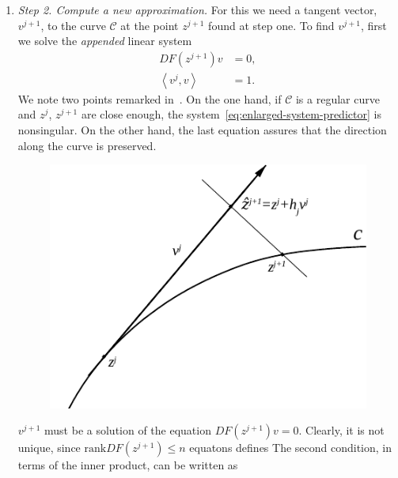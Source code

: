 \documentclass[11pt,reqno,twoside]{article}
\theoremstyle{remark}
\begin{document}
\begin{enumerate}[label = \emph{\arabic*.}]
\begin{displaymath}
\begin{split}
        z^{j}\right\rangle - h_{j}
        \end{split}
    \end{displaymath}
    that can be solved by some iterative method (for example, Newton
    method) taking form some the initial
    approximation. $z = \hat{z}^{j+1}$ is usually a good choice.
  \item \emph{Step 2. Compute a new approximation.} For this we need a
    tangent vector, $v^{j+1}$, to the curve $\mathcal{C}$ at the point
    $z^{j+1}$ found at step one. To find $v^{j+1}$, first we solve the
    \emph{appended} linear system
    \begin{equation}\label{eq:enlarged-system-predictor}
      \begin{split}
      DF\left(z^{j+1}\right)v &= 0,\\
      \left\langle v^{j}, v \right\rangle &= 1. 
    \end{split}
  \end{equation}
  We note two points remarked in~\cite{Kuznetsov2004}. On the one hand, if
  $\mathcal{C}$ is a regular curve and $z^{j}$, $z^{j+1}$ are close enough,
  the system~\eqref{eq:enlarged-system-predictor} is nonsingular. On the
  other hand,  the last equation assures that the direction along the curve
  is preserved. 
%  
\begin{figure}[!t]
  \centering
  \includegraphics[scale=1.2]{arcstep}
 \caption{\label{fig:pseudo-arc}}
\end{figure}


    $v^{j+1}$ must be a solution of the
    equation $DF\left(z^{j+1}\right) v = 0$. Clearly, it is not unique, since
      $\text{rank} DF\left(z^{j+1}\right) \le n$ 
    equatons defines  
  The second condition, in terms of the inner product, can be written as


\end{enumerate}
\end{document}
